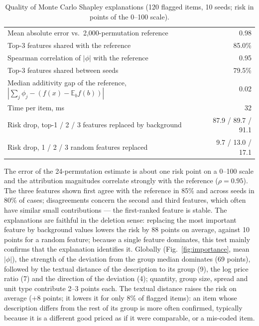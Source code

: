 \documentclass[conference]{IEEEtran}
\begin{document}
\begin{table}[t]
\centering
\caption{Quality of Monte Carlo Shapley explanations (120 flagged items, 10 seeds; risk in points of
the 0--100 scale).}
\label{tab:explain}
\footnotesize
\begin{tabular}{@{}p{}r@{}}
\toprule
Mean absolute error vs.\ 2{,}000-permutation reference & 0.98 \\
Top-3 features shared with the reference & 85.0\% \\
Spearman correlation of $|\phi|$ with the reference & 0.95 \\
Top-3 features shared between seeds & 79.5\% \\
Median additivity gap of the reference, $|\sum_j\phi_j-(f(x)-\mathbb{E}_b f(b))|$ & 0.02 \\
Time per item, ms & 32 \\
\midrule
Risk drop, top-1 / 2 / 3 features replaced by background & 87.9 / 89.7 / 91.1 \\
Risk drop, 1 / 2 / 3 random features replaced & 9.7 / 13.0 / 17.1 \\
\bottomrule
\end{tabular}
\end{table}

The error of the 24-permutation estimate is about one risk point on a 0--100 scale and the attribution
magnitudes correlate strongly with the reference ($\rho=0.95$). The three features shown first agree with
the reference in 85\% and across seeds in 80\% of cases; disagreements concern the second and third
features, which often have similar small contributions --- the first-ranked feature is stable. The
explanations are faithful in the deletion sense: replacing the most important feature by background
values lowers the risk by 88 points on average, against 10 points for a random feature; because a single
feature dominates, this test mainly confirms that the explanation identifies it. Globally (Fig.~\ref{fig:importance}, mean
$|\phi|$), the strength of the deviation from the group median dominates (69 points), followed by the
textual distance of the description to its group (9), the log price ratio (7) and the direction of the
deviation (4); quantity, group size, spread and unit type contribute 2--3 points each. The textual
distance raises the risk on average (+8 points; it lowers it for only 8\% of flagged items): an item whose
description differs from the rest of its group is more often confirmed, typically because it is a
different good priced as if it were comparable, or a mis-coded item.
\end{document}
